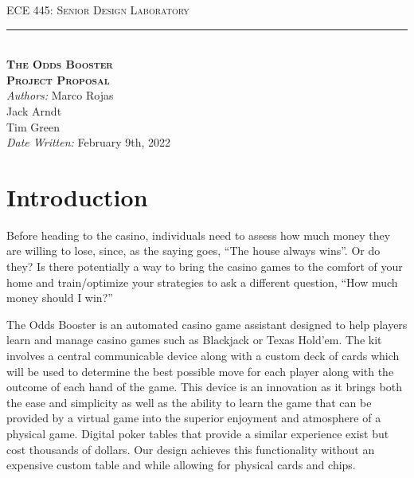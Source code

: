 \documentclass[12pt]{article}
\begin{document}
\begin{titlepage}
\begin{center}
{\LARGE \textsc{ECE 445: Senior Design Laboratory} \\ \vspace{8pt}}
\rule[13pt]{\textwidth}{1pt} \\ \vspace{120pt}
{\huge \textbf{\textsc{The Odds Booster}} \\ \vspace{8pt}}
{\LARGE \textbf{\textsc{Project Proposal}} \\ \vspace{30pt}} 
{\large \textit{Authors:} Marco Rojas \\ \vspace{4pt}
\hspace{48pt} Jack Arndt \\ \vspace{4pt}
\hspace{48pt} Tim Green \\ \vspace{4pt}
\hspace{8pt} \textit{Date Written:} February 9th, 2022}
\vfill
\end{center}

\end{titlepage}
\setcounter{page}{2}

\section{Introduction}

Before heading to the casino, individuals need to assess how much money they are willing to lose, since, as the saying goes, ``The house always wins''. Or do they? Is there potentially a way to bring the casino games to the comfort of your home and train/optimize your strategies to ask a different question, ``How much money should I win?''

The Odds Booster is an automated casino game assistant designed to help players learn and manage casino games such as Blackjack or Texas Hold'em. The kit involves a central communicable device along with a custom deck of cards which will be used to determine the best possible move for each player along with the outcome of each hand of the game. This device is an innovation as it brings both the ease and simplicity as well as the ability to learn the game that can be provided by a virtual game into the superior enjoyment and atmosphere of a physical game. Digital poker tables that provide a similar experience exist but cost thousands of dollars. Our design achieves this functionality without an expensive custom table and while allowing for physical cards and chips.
\end{document}

